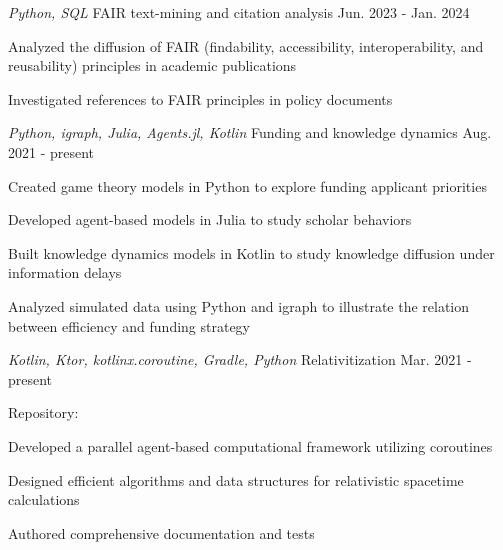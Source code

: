 

\begin{cventries}

  \cventry
    {\emph{Python, SQL}} %
    {FAIR text-mining and citation analysis} %
    {} %
    {Jun. 2023 - Jan. 2024} %
    {
      \begin{cvitems} %
        \item{Analyzed the diffusion of FAIR (findability, accessibility, interoperability, and reusability) principles in academic publications}
        \item{Investigated references to FAIR principles in policy documents}
      \end{cvitems}
    }

  \cventry
    {\emph{Python, igraph, Julia, Agents.jl, Kotlin}} %
    {Funding and knowledge dynamics} %
    {} %
    {Aug. 2021 - present} %
    {
      \begin{cvitems} %
        \item{Created game theory models in Python to explore funding applicant priorities}
        \item{Developed agent-based models in Julia to study scholar behaviors}
        \item{Built knowledge dynamics models in Kotlin to study knowledge diffusion under information delays}
        \item{Analyzed simulated data using Python and igraph to illustrate the relation between efficiency and funding strategy}
      \end{cvitems}
    }

  \cventry
    {\emph{Kotlin, Ktor, kotlinx.coroutine, Gradle, Python}} %
    {Relativitization} %
    {} %
    {Mar. 2021 - present} %
    {
      \begin{cvitems} %
        \item{Repository: \href{https://github.com/adriankhl/relativitization}{\underline{}}}
        \item{Developed a parallel agent-based computational framework utilizing coroutines}
        \item{Designed efficient algorithms and data structures for relativistic spacetime calculations}
        \item{Authored comprehensive documentation and tests}
      \end{cvitems}
    }


\end{cventries}
